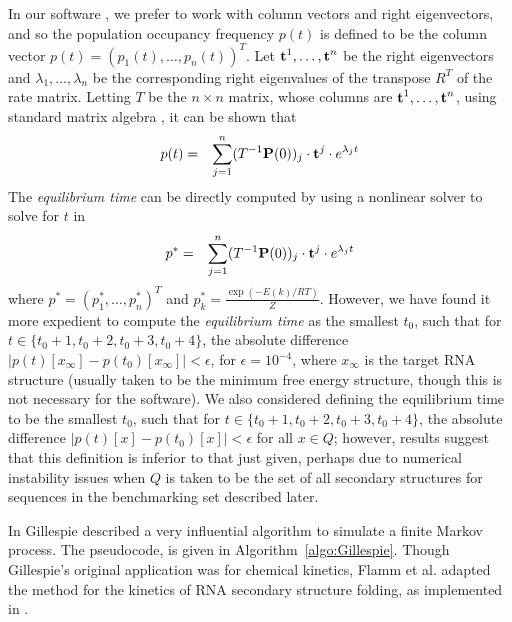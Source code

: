 In our software \hermes, we prefer to work with column vectors and
right eigenvectors, and so the population occupancy frequency
$p(t)$ is defined to be the column vector
$p(t)=(p_1(t),\ldots,p_n(t))^T$. Let
$\mbox{\bf t}^1,\ldots,\mbox{\bf t}^n$ be the right eigenvectors and
$\lambda_1,\ldots,\lambda_n$ be the corresponding right eigenvalues of the
transpose $R^T$ of the rate matrix.
Letting $T$ be the $n\times n$ matrix, whose columns are
$\mbox{\bf t}^1,\ldots,\mbox{\bf t}^n$, using standard matrix algebra
\cite{matrixTheory}, it can be shown that
\begin{eqnarray}
\label{eq:solutionMasterEquation}
p(t) &=& \sum_{j=1}^n (T^{-1}
\mbox{\bf P}(0))_j \cdot \mbox{\bf t}^j \cdot e^{\lambda_j t}
\end{eqnarray}
The {\em equilibrium time} can be directly computed by using a
nonlinear solver to solve for $t$ in
\begin{eqnarray}
\label{eq:solutionEquilibriumTime}
p^* &=& \sum_{j=1}^n (T^{-1}
\mbox{\bf P}(0))_j \cdot \mbox{\bf t}^j \cdot e^{\lambda_j t}
\end{eqnarray}
where $p^*= (p^*_1,\ldots,p^*_n)^T$ and $p^*_k = \frac{\exp(-E(k)/RT)}{Z}$.
However, we have found it more
expedient to compute the {\em equilibrium time} as the smallest $t_0$,
such that for $t \in \{t_0+1,t_0+2,t_0+3,t_0+4\}$, the absolute difference
$|p(t)[x_{\infty}] - p(t_0)[x_{\infty}]| < \epsilon$, for $\epsilon =
10^{-4}$, where $x_{\infty}$ is the target RNA structure (usually taken
to be the minimum free energy structure, though this is not necessary for
the software). We also considered defining the equilibrium time to be the
smallest $t_0$, such that for $t \in \{t_0+1,t_0+2,t_0+3,t_0+4\}$, the
absolute difference $|p(t)[x] - p(t_0)[x]| < \epsilon$ for all $x \in
Q$; however, results suggest that this definition is inferior
to that just given, perhaps due to numerical instability issues when
$Q$ is taken to be the set of all secondary structures for sequences in
the benchmarking set described later.


In \cite{gillespieStochasticSimulation1} Gillespie described
a very influential algorithm to simulate a finite Markov process.
The pseudocode, is given in Algorithm~\ref{algo:Gillespie}.
Though Gillespie's original application was for chemical kinetics,
Flamm et al.  adapted the method for the kinetics of RNA secondary structure
folding, as implemented in \kinfold \cite{flammPhD,flamm}.


